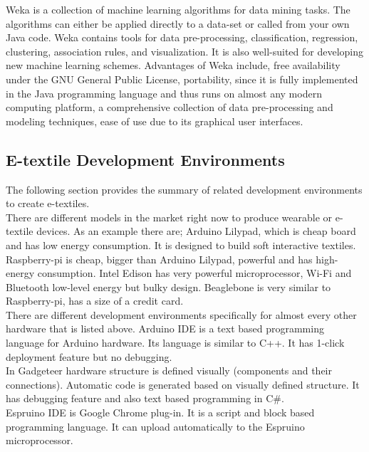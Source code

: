 Weka is a collection of machine learning algorithms for data mining tasks. The algorithms can either be applied directly to a data-set or called from your own Java code. Weka contains tools for data pre-processing, classification, regression, clustering, association rules, and visualization. It is also well-suited for developing new machine learning schemes. Advantages of Weka include, free availability under the GNU General Public License, portability, since it is fully implemented in the Java programming language and thus runs on almost any modern computing platform, a comprehensive collection of data pre-processing and modeling techniques, ease of use due to its graphical user interfaces. \\

\subsection{E-textile Development Environments}

The following section provides the summary of related development environments to create e-textiles. \\ 

	There are different models in the market right now to produce wearable or e-textile devices. As an example there are; Arduino Lilypad, which is cheap board and has low energy consumption. It is designed to build soft interactive textiles. Raspberry-pi is cheap, bigger than Arduino Lilypad, powerful and has high-energy consumption. Intel Edison has very powerful microprocessor, Wi-Fi and Bluetooth low-level energy but bulky design. Beaglebone is very similar to Raspberry-pi, has a size of a credit card. \\


There are different development environments specifically for almost every other hardware that is listed above.  Arduino IDE is a text based programming language for Arduino hardware. Its language is similar to C++. It has 1-click deployment feature but no debugging.  \\

In Gadgeteer hardware structure is defined visually (components and their connections). Automatic code is generated based on visually defined structure. It has debugging feature and also text based programming in C\#.  \\

Espruino IDE is Google Chrome plug-in. It is a script and block based programming language. It can upload automatically to the Espruino microprocessor. \\

